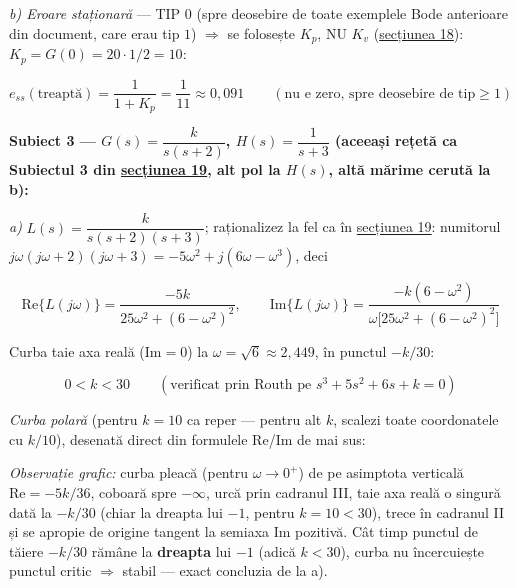 \documentclass[10pt,a4paper]{article}
\newcommand{\tip}[1]{\textcolor{blue!55!black}{#1}}
\begin{document}
\textit{b) Eroare staționară} — TIP $0$ (spre deosebire de toate exemplele Bode anterioare din document, care erau tip $1$) $\Rightarrow$ se folosește $K_p$, NU $K_v$ (\hyperref[sec:18]{secțiunea 18}): $K_p{=}G(0){=}20{\cdot}1/2{=}10$:
\begin{keyeq}\color{red!65!black}
$$e_{ss}(\text{treaptă})=\dfrac1{1+K_p}=\dfrac1{11}\approx0{,}091\qquad(\text{nu e zero, spre deosebire de tip}\ge1)$$
\end{keyeq}

\textbf{Subiect 3 — $G(s)=\dfrac k{s(s+2)}$, $H(s)=\dfrac1{s+3}$ (aceeași rețetă ca Subiectul 3 din \hyperref[sec:19]{secțiunea 19}, alt pol la $H(s)$, altă mărime cerută la b):}

\textit{a)} $L(s){=}\dfrac k{s(s+2)(s+3)}$; raționalizez la fel ca în \hyperref[sec:19]{secțiunea 19}: numitorul $j\omega(j\omega{+}2)(j\omega{+}3){=}{-}5\omega^2{+}j(6\omega{-}\omega^3)$, deci
\begin{keyeq}\color{red!65!black}
$$\mathrm{Re}\{L(j\omega)\}=\dfrac{-5k}{25\omega^2+(6-\omega^2)^2},\qquad \mathrm{Im}\{L(j\omega)\}=\dfrac{-k(6-\omega^2)}{\omega\big[25\omega^2+(6-\omega^2)^2\big]}$$
\end{keyeq}
Curba taie axa reală (Im$=0$) la $\omega{=}\sqrt6{\approx}2{,}449$, în punctul $-k/30$:
\begin{keyeq}\color{red!65!black}
$$0<k<30\qquad(\text{verificat prin Routh pe } s^3+5s^2+6s+k=0)$$
\end{keyeq}

\textit{Curba polară} (pentru $k{=}10$ ca reper — pentru alt $k$, scalezi toate coordonatele cu $k/10$), desenată direct din formulele Re/Im de mai sus:
\begin{center}
\end{center}
\tip{\textit{Observație grafic:} curba pleacă (pentru $\omega\to0^+$) de pe asimptota verticală $\mathrm{Re}{=}{-}5k/36$, coboară spre $-\infty$, urcă prin cadranul III, taie axa reală o singură dată la $-k/30$ (chiar la dreapta lui $-1$, pentru $k{=}10{<}30$), trece în cadranul II și se apropie de origine tangent la semiaxa Im pozitivă. Cât timp punctul de tăiere $-k/30$ rămâne la \textbf{dreapta} lui $-1$ (adică $k{<}30$), curba nu încercuiește punctul critic $\Rightarrow$ stabil — exact concluzia de la a).}
\end{document}
